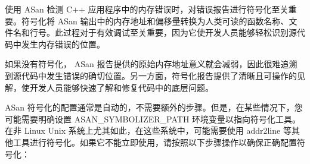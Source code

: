 
使用 ASan 检测 C++ 应用程序中的内存错误时，对错误报告进行符号化至关重要。符号化将 ASan 输出中的内存地址和偏移量转换为人类可读的函数名称、文件名和行号。此过程对于有效调试至关重要，因为它使开发人员能够轻松识别源代码中发生内存错误的位置。

如果没有符号化， ASan 报告提供的原始内存地址意义就会减弱，因此很难追溯到源代码中发生错误的确切位置。另一方面，符号化报告提供了清晰且可操作的见解，使开发人员能够快速了解和修复代码中的底层问题。

ASan 符号化的配置通常是自动的，不需要额外的步骤。但是，在某些情况下，您可能需要明确设置 ASAN\_SYMBOLIZER\_PATH 环境变量以指向符号化工具。在非 Linux Unix 系统上尤其如此，在这些系统中，可能需要使用 addr2line 等其他工具进行符号化。如果它不能立即使用，请按照以下步骤操作以确保正确配置符号化：

